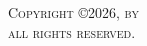 \newpage
\thispagestyle{empty}
\addtocounter{page}{-1}
\vspace*{\fill}
\scshape \noindent Copyright \copyright 2026, by \authorname \\
\noindent all rights reserved.
\vspace*{\fill}
\newpage
\rm